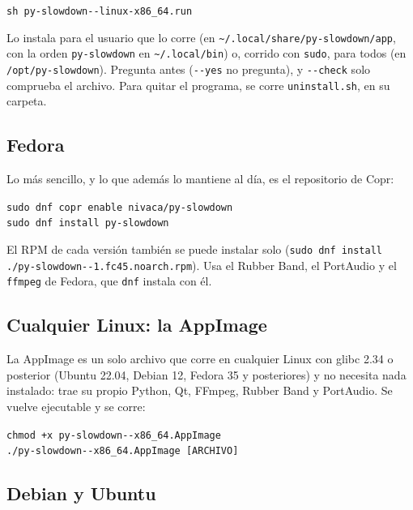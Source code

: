 \documentclass[12pt,
              article,
              oneside
              ]{memoir}
\renewenvironment{quote}%
 {\begin{list}{}%
              {\setlength\rightmargin{0pt}%
              \setlength\leftmargin{\parindent}}%
  \item[]\small\ignorespaces}
 {\unskip\end{list}}
\begin{document}
\begin{quote}
\texttt{sh py-slowdown-\version-linux-x86\_64.run}
\end{quote}

\noindent Lo instala para el usuario que lo corre (en
\texttt{\textasciitilde/.local/share/py-slowdown/app}, con la orden
\texttt{py-slowdown} en \texttt{\textasciitilde/.local/bin}) o, corrido con
\texttt{sudo}, para todos (en \texttt{/opt/py-slowdown}). Pregunta antes
(\texttt{-{}-yes} no pregunta), y \texttt{-{}-check} solo comprueba el
archivo. Para quitar el programa, se corre \texttt{uninstall.sh}, en su
carpeta.

\subsection{Fedora}

%
Lo más sencillo, y lo que además lo mantiene al día, es el repositorio de
Copr:

\begin{quote}
\texttt{sudo dnf copr enable nivaca/py-slowdown}\\
\texttt{sudo dnf install py-slowdown}
\end{quote}

\noindent El RPM de cada versión también se puede instalar solo
(\texttt{sudo dnf install ./py-slowdown-\version-1.fc45.noarch.rpm}). Usa
el Rubber Band, el PortAudio y el \texttt{ffmpeg} de Fedora, que
\texttt{dnf} instala con él.

\subsection{Cualquier Linux: la AppImage}

%
La AppImage es un solo archivo que corre en cualquier Linux con glibc 2.34
o posterior (Ubuntu 22.04, Debian 12, Fedora 35 y posteriores) y no
necesita nada instalado: trae su propio Python, Qt, FFmpeg, Rubber Band y
PortAudio. Se vuelve ejecutable y se corre:

\begin{quote}
\texttt{chmod +x py-slowdown-\version-x86\_64.AppImage}\\
\texttt{./py-slowdown-\version-x86\_64.AppImage [ARCHIVO]}
\end{quote}

\subsection{Debian y Ubuntu}
\end{document}
